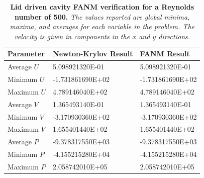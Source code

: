 \begin{table}[h!]
  \begin{center}
    \begin{tabular}{lll}\hline\hline
      \multicolumn{1}{l}{Parameter}& 
      \multicolumn{1}{l}{Newton-Krylov Result}&
      \multicolumn{1}{l}{FANM Result}\\
      \hline
      Average $U$ & 5.098921320E-01 & 5.098921320E-01 \\
      Minimum $U$ & -1.731861690E+02 & -1.731861690E+02 \\
      Maximum $U$ & 4.789146040E+02 & 4.789146040E+02 \\
      \hline
      Average $V$ & 1.365493140E-01 & 1.365493140E-01 \\
      Minimum $V$ & -3.170930360E+02 & -3.170930360E+02 \\
      Maximum $V$ & 1.655401440E+02 & 1.655401440E+02 \\
      \hline
      Average $P$ & -9.378317550E+03 & -9.378317550E+03 \\
      Minimum $P$ & -4.155215280E+04 & -4.155215280E+04 \\
      Maximum $P$ & 2.058742010E+05 & 2.058742010E+05 \\
      \hline\hline
    \end{tabular}
  \end{center}
  \caption{\textbf{Lid driven cavity FANM verification for a Reynolds
      number of 500.} \textit{The values reported are global minima,
      maxima, and averages for each variable in the problem. The
      velocity is given in components in the $x$ and $y$ directions.}}
  \label{tab:driven_re500_results}
\end{table}

